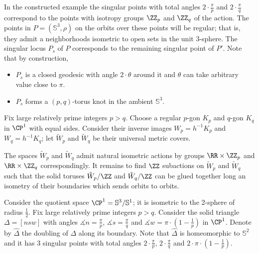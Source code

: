 In the constructed example 
the singular points with total angles $2\cdot\tfrac\pi p$ and
$2\cdot\tfrac\pi q$
correspond to the points with isotropy groups $\ZZ_p$ and $\ZZ_q$ of the action.
The points in $P=(\mathbb{S}^3,\rho)$ on the orbits over these points will be regular; 
that is, they admit a neighborhoods isometric to open sets in the unit 3-sphere.
The singular locus $P_s$
of $P$ corresponds to the remaining singular point of $P'$.
Note that by construction,
\begin{itemize}
\item $P_s$ is a closed geodesic with angle $2\cdot\theta$ around it and $\theta$ can take arbitrary value close to $\pi$.
\item $P_s$ forms a $(p,q)$-torus knot in the ambient $\mathbb{S}^3$.
\end{itemize}
\qedsf






















Fix large relatively prime integers $p>q$.
Choose a regular $p$-gon $K_p$ and $q$-gon $K_q$ in $\CP^1$ with equal sides.
Consider their inverse images $W_p=h^{-1}K_p$ and $W_q=h^{-1}K_q$;
let $\tilde W_p$ and $\tilde W_q$ be their universal metric covers.

The spaces $\tilde W_p$ and $\tilde W_q$ admit natural isometric actions by groups $\RR\times\ZZ_p$ and $\RR\times\ZZ_q$ correspondingly.
It remains to find $\ZZ$ subactions on $\tilde W_p$ and $\tilde W_q$ such that the solid toruses $\tilde W_p/\ZZ$ and $\tilde W_q/\ZZ$ can be glued together long an isometry of their boundaries which sends orbits to orbits.

Consider the quotient space $\CP^1=\mathbb S^3/\mathbb S^1$;
it is isometric to the 2-sphere of radius $\tfrac12$.
Fix large relatively prime integers $p>q$. 
Consider the solid triangle $\Delta=[nsw]$ with angles $\measuredangle n=\tfrac\pi p$, $\measuredangle s=\tfrac\pi q$ and $\measuredangle w=\pi\cdot(1-\tfrac1 p)$ in $\CP^1$.
Denote by $\hat \Delta$ the  doubling of $\Delta$ along  its boundary.
Note that $\hat \Delta$ is homeomorphic to $\mathbb S^2$ and
it has 3 singular points with total angles $2\cdot\tfrac\pi p$,
$2\cdot\tfrac\pi q$ and $2\cdot\pi\cdot(1-\tfrac1 p)$.

